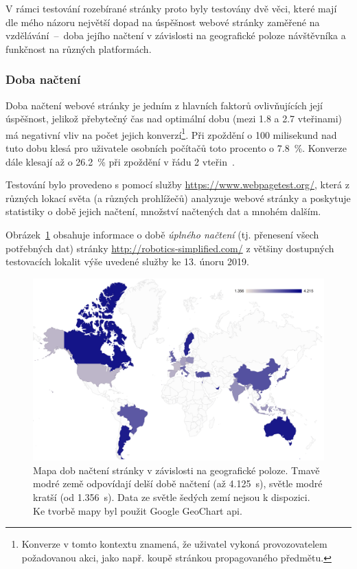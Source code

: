 \documentclass[a4paper, 12pt, twoside]{article}
\begin{document}
  V rámci testování rozebírané stránky proto byly testovány dvě věci, které mají dle mého názoru největší dopad na úspěšnost webové stránky zaměřené na vzdělávání~--~doba jejího načtení v závislosti na geografické poloze návštěvníka a funkčnost na různých platformách.


  \subsubsection{Doba načtení}
  Doba načtení webové stránky je jedním z hlavních faktorů ovlivňujících její úspěšnost, jelikož přebytečný čas nad optimální dobu (mezi \num{1.8} a \num{2.7} vteřinami) má negativní vliv na počet jejich konverzí\footnote{Konverze v tomto kontextu znamená, že uživatel vykoná provozovatelem požadovanou akci, jako např. koupě stránkou propagovaného předmětu.}. Při zpoždění o \num{100} milisekund nad tuto dobu klesá pro uživatele osobních počítačů toto procento o \SI{7.8}{\percent}. Konverze dále klesají až o \SI{26.2}{\percent} při zpoždění v řádu \num{2} vteřin~\cite{conversion-rate-statistics}.

  Testování bylo provedeno s pomocí služby \url{https://www.webpagetest.org/}, která z různých lokací světa (a různých prohlížečů) analyzuje webové stránky a poskytuje statistiky o době jejich načtení, množství načtených dat a mnohém dalším.

  Obrázek~\ref{img:Mapa dob načtení stránky v závislosti na geografické poloze} obsahuje informace o době \emph{úplného načtení} (tj. přenesení všech potřebných dat) stránky \url{http://robotics-simplified.com/} z většiny dostupných testovacích lokalit výše uvedené služby ke 13. únoru 2019.

  \begin{figure}[H]
    \includegraphics[width=\linewidth]{map.png}
    \caption[Mapa dob načtení stránky v závislosti na geografické poloze]{Mapa dob načtení stránky v závislosti na geografické poloze. Tmavě modré země odpovídají delší době načtení (až \SI{4.125}{\second}), světle modré kratší (od \SI{1.356}{\second}). Data ze světle šedých zemí nejsou k dispozici. Ke tvorbě mapy byl použit Google GeoChart \acrshort{api}.} \label{img:Mapa dob načtení stránky v závislosti na geografické poloze}
  \end{figure}
\end{document}
